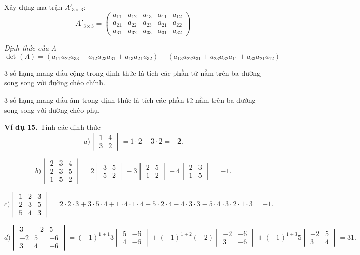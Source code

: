 Xây dựng ma trận \( A'_{3 \times 3} \):
\[
A'_{3 \times 3} = \begin{pmatrix}
a_{11} & a_{12} & a_{13} & a_{11} & a_{12} \\
a_{21} & a_{22} & a_{23} & a_{21} & a_{22} \\
a_{31} & a_{32} & a_{33} & a_{31} & a_{32}
\end{pmatrix}
\]

\textit{Định thức của A}
\[
\det(A) = (a_{11}a_{22}a_{33} + a_{12}a_{23}a_{31} + a_{13}a_{21}a_{32}) - (a_{13}a_{22}a_{31} + a_{23}a_{32}a_{11} + a_{33}a_{21}a_{12})
\]

3 số hạng mang dấu cộng trong định thức là tích các phần tử nằm trên ba đường song song với đường chéo chính.

3 số hạng mang dấu âm trong định thức là tích các phần tử nằm trên ba đường song song với đường chéo phụ.

\textbf{Ví dụ 15.} Tính các định thức
\[
a) \begin{vmatrix}
1 & 4 \\
3 & 2
\end{vmatrix} = 1 \cdot 2 - 3 \cdot 2 = -2.
\]

\[
b) \begin{vmatrix}
2 & 3 & 4 \\
2 & 3 & 5 \\
1 & 5 & 2
\end{vmatrix} = 2 \begin{vmatrix}
3 & 5 \\
5 & 2
\end{vmatrix} - 3 \begin{vmatrix}
2 & 5 \\
1 & 2
\end{vmatrix} + 4 \begin{vmatrix}
2 & 3 \\
1 & 5
\end{vmatrix} = -1.
\]

\[
c) \begin{vmatrix}
1 & 2 & 3 \\
2 & 3 & 5 \\
5 & 4 & 3
\end{vmatrix} = 2 \cdot 2 \cdot 3 + 3 \cdot 5 \cdot 4 + 1 \cdot 4 \cdot 1 \cdot 4 - 5 \cdot 2 \cdot 4 - 4 \cdot 3 \cdot 3 - 5 \cdot 4 \cdot 3 \cdot 2 \cdot 1 \cdot 3 = -1.
\]

\[
d) \begin{vmatrix}
3 & -2 & 5 \\
-2 & 5 & -6 \\
3 & 4 & -6
\end{vmatrix} = (-1)^{1+1}3 \begin{vmatrix}
5 & -6 \\
4 & -6
\end{vmatrix} + (-1)^{1+2} (-2) \begin{vmatrix}
-2 & -6 \\
3 & -6
\end{vmatrix} + (-1)^{1+3} 5 \begin{vmatrix}
-2 & 5 \\
3 & 4
\end{vmatrix} = 31.
\]

